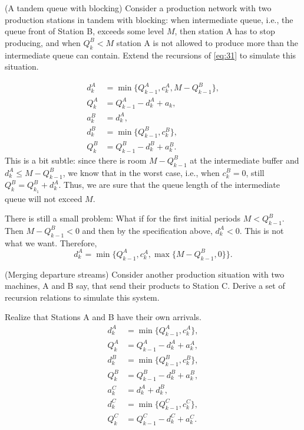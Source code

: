 \begin{exercise} (A tandem queue with blocking)
  Consider a production network with two production stations in tandem
  with blocking: when intermediate queue, i.e., the queue front of
  Station B, exceeds some level $M$, then station A has to stop
  producing, and when $Q^B_k < M$ station A is not allowed to produce
  more than the intermediate queue can contain. Extend the recursions
  of \eqref{eq:31} to simulate this situation.
\begin{solution}
\begin{equation}
  \begin{split}
    d^A_k &= \min\{Q_{k-1}^A, c_k^A, M-Q^B_{k-1}\}, \\
    Q_k^A &= Q_{k-1}^A -d_k^A + a_k, \\
    a_k^B &= d_{k}^A,\\
    d^B_k &= \min\{Q_{k-1}^B, c_k^B\}, \\
    Q_k^B &= Q_{k-1}^B -d_k^B + a_k^B.
  \end{split}
\end{equation}
This is a bit subtle: since there is room $M-Q^B_{k-1}$ at the
intermediate buffer and $d_k^A \leq M-Q^B_{k-1}$, we know that in the
worst case, i.e., when $c_k^B=0$, still $Q^B_k = Q_{k_1}^B +
d_k^A$.
Thus, we are sure that the queue length of the intermediate queue will
not exceed $M$.

There is still  a small problem: What if for the first initial periods  $M<Q^B_{k-1}$. Then $M-Q^B_{k-1}<0$ and then by the specification above, $d_k^A < 0$. This is not what we want. Therefore, 
\begin{equation*}
  d^A_k = \min\{Q_{k-1}^A, c_k^A, \max\{M-Q^B_{k-1}, 0\}\}.
\end{equation*}
\end{solution}
\end{exercise}

\begin{exercise} (Merging departure streams)
  Consider another production situation with two machines, A and B
  say, that send their products to Station C. Derive a set of
  recursion relations to simulate this system. 
\begin{solution}
Realize that Stations A and B have their own arrivals. 
\begin{equation}
  \begin{split}
    d^A_k &= \min\{Q_{k-1}^A, c_k^A\}, \\
    Q_k^A &= Q_{k-1}^A -d_k^A + a_k^A, \\
    d^B_k &= \min\{Q_{k-1}^B, c_k^B\}, \\
    Q_k^B &= Q_{k-1}^B -d_k^B + a_k^B, \\
    a_k^C &= d_{k}^A+d_{k}^B,\\
    d^C_k &= \min\{Q_{k-1}^C, c_k^C\}, \\
    Q_k^C &= Q_{k-1}^C -d_k^C + a_k^C.
  \end{split}
\end{equation}
\end{solution}
\end{exercise}


